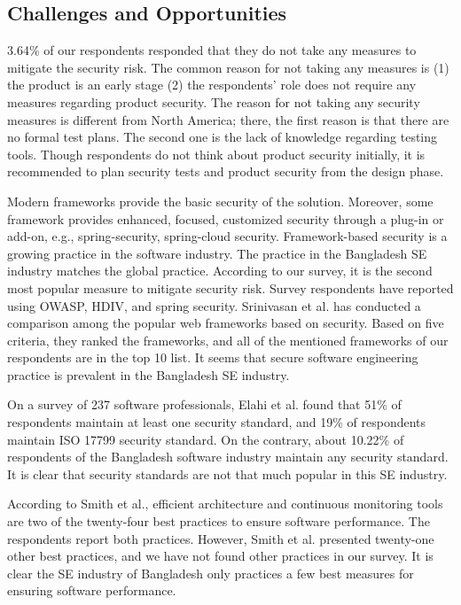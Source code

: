\subsection{Challenges and Opportunities}
\label{dicussion challanges}


3.64\% of our respondents responded that they do not take any measures to mitigate the security risk. The common reason for not taking any measures is (1) the product is an early stage (2) the respondents' role does not require any measures regarding product security. The reason for not taking any security measures is different from North America\cite{Assal2019}; there, the first reason is that there are no formal test plans. The second one is the lack of knowledge regarding testing tools. Though respondents do not think about product security initially, it is recommended\cite{Chandra2009,Azham2011} to plan security tests and product security from the design phase.

Modern frameworks provide the basic security of the solution. Moreover, some framework provides enhanced, focused, customized security through a plug-in or add-on, e.g., spring-security, spring-cloud security. Framework-based security is a growing practice in the software industry\cite{Alssir2012}.  The practice in the Bangladesh SE industry matches the global practice. According to our survey, it is the second most popular measure to mitigate security risk. Survey respondents have reported using OWASP, HDIV, and spring security. Srinivasan et al.\cite{Srinivasan2017} has conducted a comparison among the popular web frameworks based on security. Based on five criteria, they ranked the frameworks, and all of the mentioned frameworks of our respondents are in the top 10 list. It seems that secure software engineering practice is prevalent in the Bangladesh SE industry.


On a survey of 237 software professionals, Elahi et al.\cite{Elahi2011} found that 51\% of respondents maintain at least one security standard, and 19\% of respondents maintain ISO 17799 security standard. On the contrary, about 10.22\% of respondents of the Bangladesh software industry maintain any security standard. It is clear that security standards are not that much popular in this SE industry.

According to Smith et al.\cite{Smith2003}, efficient architecture and continuous monitoring tools are two of the twenty-four best practices to ensure software performance.  The respondents report both practices. However, Smith et al. presented twenty-one other best practices, and we have not found other practices in our survey. It is clear the SE industry of Bangladesh only practices a few best measures for ensuring software performance.

